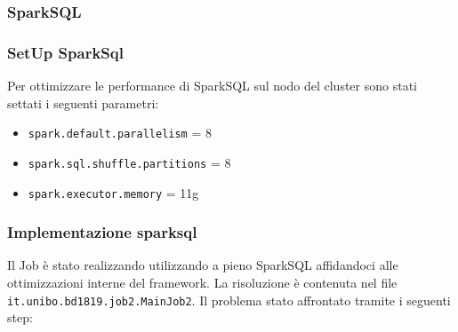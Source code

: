 \subsubsection{SparkSQL}

\subsubsection{SetUp SparkSql}
Per ottimizzare le performance di SparkSQL sul nodo del cluster sono stati settati i seguenti parametri:
\begin{itemize}
    \item \texttt{spark.default.parallelism} = 8
    \item \texttt{spark.sql.shuffle.partitions} = 8
    \item \texttt{spark.executor.memory} = 11g
\end{itemize}

\subsubsection{Implementazione sparksql}

Il Job è stato realizzando utilizzando a pieno SparkSQL affidandoci alle ottimizzazioni interne del framework. La risoluzione è contenuta nel file \texttt{it.unibo.bd1819.job2.MainJob2}. Il problema
\è stato affrontato tramite i seguenti step:


